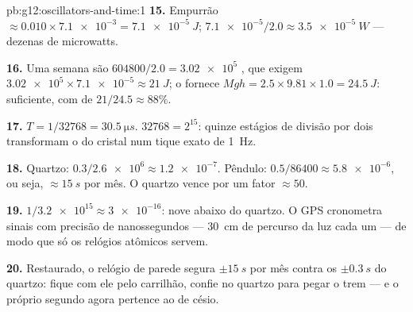 \begin{solution}{pb:g12:oscillators-and-time:1}
\textbf{15.} Empurrão $\approx 0.010 \times \num{7.1e-3} =
\qty{7.1e-5}{J}$;  $\num{7.1e-5}/2.0 \approx \qty{3.5e-5}{W}$
--- dezenas de microwatts.

\textbf{16.} Uma semana são $604800/2.0 = \num{3.02e5}$ , que
exigem $\num{3.02e5} \times \num{7.1e-5} \approx \qty{21}{J}$; o 
fornece $Mgh = 2.5 \times 9.81 \times 1.0 = \qty{24.5}{J}$: suficiente,
com  de $21/24.5 \approx 88\%$.

\textbf{17.} $T = 1/\num{32768} = \qty{30.5}{\micro s}$.
$\num{32768} = 2^{15}$: quinze estágios de divisão por dois transformam o
 do cristal num tique exato de \qty{1}{Hz}.

\textbf{18.} Quartzo: $0.3/\num{2.6e6} \approx \num{1.2e-7}$. Pêndulo:
$0.5/86400 \approx \num{5.8e-6}$, ou seja, $\approx \qty{15}{s}$ por mês.
O quartzo vence por um fator $\approx 50$.

\textbf{19.} $1/\num{3.2e15} \approx \num{3e-16}$: nove  abaixo do quartzo. O GPS cronometra sinais com precisão de
nanossegundos --- \qty{30}{cm} de percurso da luz cada um --- de modo que
só os relógios atômicos servem.

\textbf{20.} Restaurado, o relógio de parede segura $\pm\qty{15}{s}$ por
mês contra os $\pm\qty{0.3}{s}$ do quartzo: fique com ele pelo carrilhão,
confie no quartzo para pegar o trem --- e o próprio segundo agora
pertence ao  de césio.
\end{solution}
